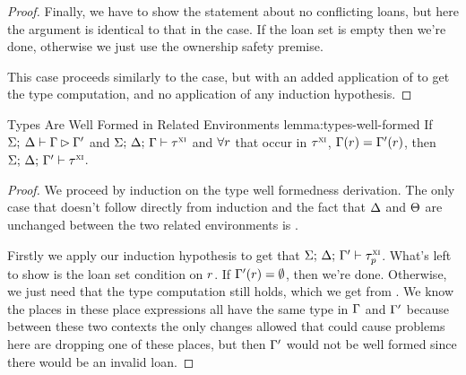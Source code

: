 \begin{proof}
  Finally, we have to show the statement about no conflicting loans, but here
  the argument is identical to that in the  case. If the
  loan set is empty then we're done, otherwise we just use the ownership safety
  premise.

  \vspace{1em}
  \noindent \framebox[\textwidth]{ \figuresize
    \begin{mathpar}
      \ODerefAbs
    \end{mathpar}
  } \vspace{1em}

  This case proceeds similarly to the  case, but with an added
  application of  to get the type computation,
  and no application of any induction hypothesis.
\end{proof}

\begin{oxlemma}{Types Are Well Formed in Related Environments}
  {lemma:types-well-formed} If $\Sigma; \: \Delta \vdash \Gamma \rhd \Gamma^\prime$ and $\Sigma; \, \Delta; \, \Gamma \vdash \tau^\textsc{xi}$ and $\forall r$ that occur in $\tau^\textsc{xi}$,
  $\Gamma(r) = \Gamma^\prime(r)$, then
  $\Sigma; \, \Delta; \, \Gamma^\prime \vdash \tau^\textsc{xi}$.
\end{oxlemma}

\begin{proof}
  We proceed by induction on the type well formedness derivation. The only case
  that doesn't follow directly from induction and the fact that $\Delta$ and
  $\Theta$ are unchanged between the two related environments is
  .

  \vspace{1em}
  \noindent \framebox[\textwidth]{ \figuresize
    \begin{mathpar}
      \VRef
    \end{mathpar}
  } \vspace{1em}

  Firstly we apply our induction hypothesis to get that
  $\Sigma; \, \Delta; \, \Gamma^\prime \vdash \tau^\textsc{xi}_p$. What's left to show is the loan
  set condition on $r$. If $\Gamma^\prime(r) = \emptyset$, then
  we're done. Otherwise, we just need that the type computation still holds,
  which we get from . We know the places in
  these place expressions all have the same type in $\Gamma$ and
  $\Gamma^\prime$ because between these two contexts the only changes allowed
  that could cause problems here are dropping one of these places, but then
  $\Gamma^\prime$ would not be well formed since there would be an invalid
  loan.

\end{proof}

